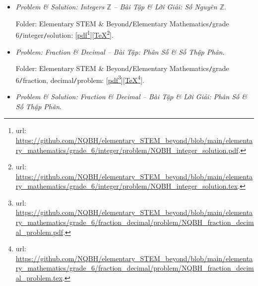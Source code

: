 \documentclass[12pt]{article}
\begin{document}
\begin{itemize}
	Folder: {\sf Elementary STEM \& Beyond{\tt/}Elementary Mathematics{\tt/}grade 6{\tt/}integer{\tt/}problem}: [\href{https://github.com/NQBH/elementary_STEM_beyond/blob/main/elementary_mathematics/grade_6/integer/problem/NQBH_integer_problem.pdf}{pdf}\footnote{{\sc url}: \url{https://github.com/NQBH/elementary_STEM_beyond/blob/main/elementary_mathematics/grade_6/integer/problem/NQBH_integer_problem.pdf}.}][\href{https://github.com/NQBH/elementary_STEM_beyond/blob/main/elementary_mathematics/grade_6/integer/problem/NQBH_integer_problem.tex}{\TeX}\footnote{{\sc url}: \url{https://github.com/NQBH/elementary_STEM_beyond/blob/main/elementary_mathematics/grade_6/integer/problem/NQBH_integer_problem.tex}.}].
	\item {\it Problem \& Solution: Integers $\mathbb{Z}$ -- Bài Tập \& Lời Giải: Số Nguyên $\mathbb{Z}$}.
	
	Folder: {\sf Elementary STEM \& Beyond{\tt/}Elementary Mathematics{\tt/}grade 6{\tt/}integer{\tt/}solution}: [\href{https://github.com/NQBH/elementary_STEM_beyond/blob/main/elementary_mathematics/grade_6/integer/problem/NQBH_integer_solution.pdf}{pdf}\footnote{{\sc url}: \url{https://github.com/NQBH/elementary_STEM_beyond/blob/main/elementary_mathematics/grade_6/integer/problem/NQBH_integer_solution.pdf}.}][\href{https://github.com/NQBH/elementary_STEM_beyond/blob/main/elementary_mathematics/grade_6/integer/problem/NQBH_integer_solution.tex}{\TeX}\footnote{{\sc url}: \url{https://github.com/NQBH/elementary_STEM_beyond/blob/main/elementary_mathematics/grade_6/integer/problem/NQBH_integer_solution.tex}.}].
	\item {\it Problem: Fraction \& Decimal -- Bài Tập: Phân Số {\it\&} Số Thập Phân}.
	
	Folder: {\sf Elementary STEM \& Beyond{\tt/}Elementary Mathematics{\tt/}grade 6{\tt/}fraction, decimal{\tt/}problem}: [\href{https://github.com/NQBH/elementary_STEM_beyond/blob/main/elementary_mathematics/grade_6/fraction_decimal/problem/NQBH_fraction_decimal_problem.pdf}{pdf}\footnote{{\sc url}: \url{https://github.com/NQBH/elementary_STEM_beyond/blob/main/elementary_mathematics/grade_6/fraction_decimal/problem/NQBH_fraction_decimal_problem.pdf}.}][\href{https://github.com/NQBH/elementary_STEM_beyond/blob/main/elementary_mathematics/grade_6/fraction_decimal/problem/NQBH_fraction_decimal_problem.tex}{\TeX}\footnote{{\sc url}: \url{https://github.com/NQBH/elementary_STEM_beyond/blob/main/elementary_mathematics/grade_6/fraction_decimal/problem/NQBH_fraction_decimal_problem.tex}.}].
	\item {\it Problem \& Solution: Fraction \& Decimal -- Bài Tập \& Lời Giải: Phân Số {\it\&} Số Thập Phân}.
	

\end{itemize}
\end{document}

